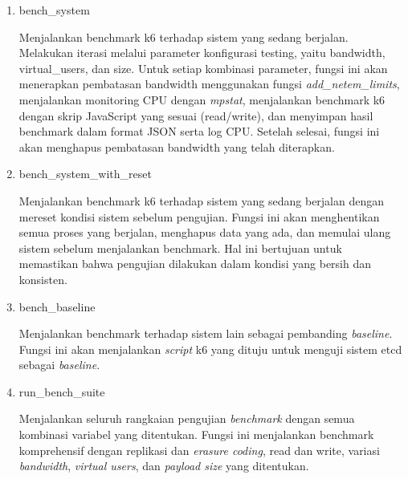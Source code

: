 \begin{enumerate}  
  \item bench\_system
  
  Menjalankan benchmark k6 terhadap sistem yang sedang berjalan. Melakukan iterasi melalui parameter konfigurasi testing, yaitu bandwidth, virtual\_users, dan size. Untuk setiap kombinasi parameter, fungsi ini akan menerapkan pembatasan bandwidth menggunakan fungsi \textit{add\_netem\_limits}, menjalankan monitoring CPU dengan \textit{mpstat}, menjalankan benchmark k6 dengan skrip JavaScript yang sesuai (read/write), dan menyimpan hasil benchmark dalam format JSON serta log CPU. Setelah selesai, fungsi ini akan menghapus pembatasan bandwidth yang telah diterapkan.

  \item bench\_system\_with\_reset

  Menjalankan benchmark k6 terhadap sistem yang sedang berjalan dengan mereset kondisi sistem sebelum pengujian. Fungsi ini akan menghentikan semua proses yang berjalan, menghapus data yang ada, dan memulai ulang sistem sebelum menjalankan benchmark. Hal ini bertujuan untuk memastikan bahwa pengujian dilakukan dalam kondisi yang bersih dan konsisten.
  
  \item bench\_baseline
  
  Menjalankan benchmark terhadap sistem lain sebagai pembanding \textit{baseline}. Fungsi ini akan menjalankan \textit{script} k6 yang dituju untuk menguji sistem etcd sebagai \textit{baseline}. 
  
  \item run\_bench\_suite
  
  Menjalankan seluruh rangkaian pengujian \textit{benchmark} dengan semua kombinasi variabel yang ditentukan. Fungsi ini menjalankan benchmark komprehensif dengan replikasi dan \textit{erasure coding}, read dan write, variasi \textit{bandwidth}, \textit{virtual users}, dan \textit{payload size} yang ditentukan.
\end{enumerate}

